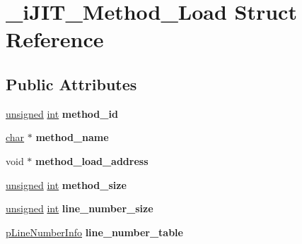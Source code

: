 \hypertarget{struct__iJIT__Method__Load}{}\section{\+\_\+i\+J\+I\+T\+\_\+\+Method\+\_\+\+Load Struct Reference}
\label{struct__iJIT__Method__Load}
\subsection*{Public Attributes}
\begin{DoxyCompactItemize}
\item 
\mbox{\label{struct__iJIT__Method__Load_a4749361629cb18a2134ffcfb7c5009c3}} 
\mbox{\hyperlink{classunsigned}{unsigned}} \mbox{\hyperlink{classint}{int}} {\bfseries method\+\_\+id}
\item 
\mbox{\label{struct__iJIT__Method__Load_a5a199a135f5c11023ae612a4d78ad7c5}} 
\mbox{\hyperlink{classchar}{char}} $\ast$ {\bfseries method\+\_\+name}
\item 
\mbox{\label{struct__iJIT__Method__Load_af528d810e75a9db278ee900432cd17c8}} 
void $\ast$ {\bfseries method\+\_\+load\+\_\+address}
\item 
\mbox{\label{struct__iJIT__Method__Load_ab68d7a5a9552ec49bd7baa01c03d1f72}} 
\mbox{\hyperlink{classunsigned}{unsigned}} \mbox{\hyperlink{classint}{int}} {\bfseries method\+\_\+size}
\item 
\mbox{\label{struct__iJIT__Method__Load_a18fba4fe0f235d81be7e6661c8de2890}} 
\mbox{\hyperlink{classunsigned}{unsigned}} \mbox{\hyperlink{classint}{int}} {\bfseries line\+\_\+number\+\_\+size}
\item 
\mbox{\label{struct__iJIT__Method__Load_a8cc078c6201ccc6fd2e292e82cb061ae}} 
\mbox{\hyperlink{struct__LineNumberInfo}{p\+Line\+Number\+Info}} {\bfseries line\+\_\+number\+\_\+table}
\item 
\mbox{\label{struct__iJIT__Method__Load_a4bc1739953218a3f24f919936c5aa262}} 

\end{DoxyCompactItemize}
